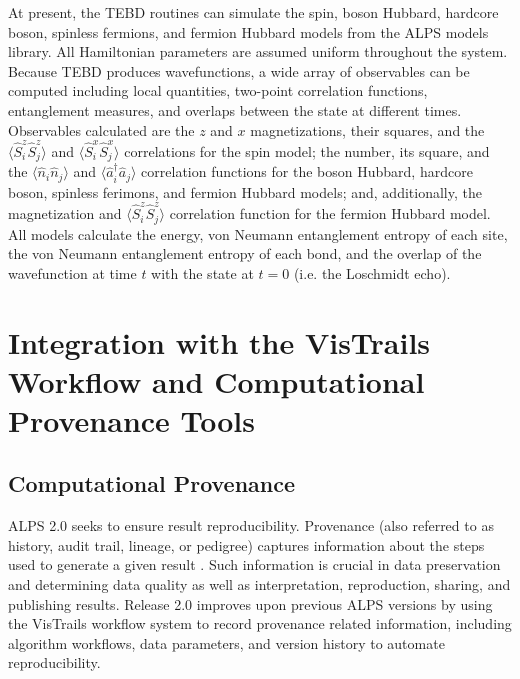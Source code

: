 \documentclass[12pt]{iopart}
\begin{document}
At present, the TEBD routines can simulate the spin, boson Hubbard, hardcore boson, spinless fermions, and fermion Hubbard models from the ALPS models library.  All 
Hamiltonian parameters are assumed uniform throughout the system.  Because TEBD produces wavefunctions, a wide array of observables can be computed including local quantities, two-point correlation functions, entanglement measures, and overlaps between the state at different times.  Observables calculated are the $z$ and $x$ magnetizations, their squares, and the $\langle \hat{S}^z_i 
\hat{S}^z_j\rangle$ and $\langle \hat{S}^x_i \hat{S}^x_j\rangle$ correlations for the spin model; the number, its square, and the $\langle \hat{n}_i \hat{n}_j\rangle$ and 
$\langle \hat{a}_i^{\dagger} \hat{a}_j\rangle$ correlation functions for the boson Hubbard, hardcore boson, spinless ferimons, and fermion Hubbard models; and, additionally, 
the magnetization and $\langle \hat{S}^z_i \hat{S}^z_j\rangle$ correlation function for the fermion Hubbard model.  All models calculate the energy, von Neumann entanglement 
entropy of each site, the von Neumann entanglement entropy of each bond, and the overlap of the wavefunction at time $t$ with the state at $t=0$ (i.e. the Loschmidt echo).


\section{Integration with the VisTrails Workflow and Computational Provenance Tools}

\subsection{Computational Provenance}

ALPS 2.0 seeks to ensure result reproducibility.  Provenance (also
referred to as history, audit trail, lineage, or pedigree) captures
information about the steps used to generate a given result
\cite{Silva07,Freire08}.  Such information is crucial in data
preservation and determining data quality as well as interpretation,
reproduction, sharing, and publishing results.  Release 2.0 improves
upon previous ALPS versions by using the VisTrails \cite{vistrails}
workflow system to record provenance related information, including
algorithm workflows, data parameters, and version history to automate
reproducibility.
\end{document}
